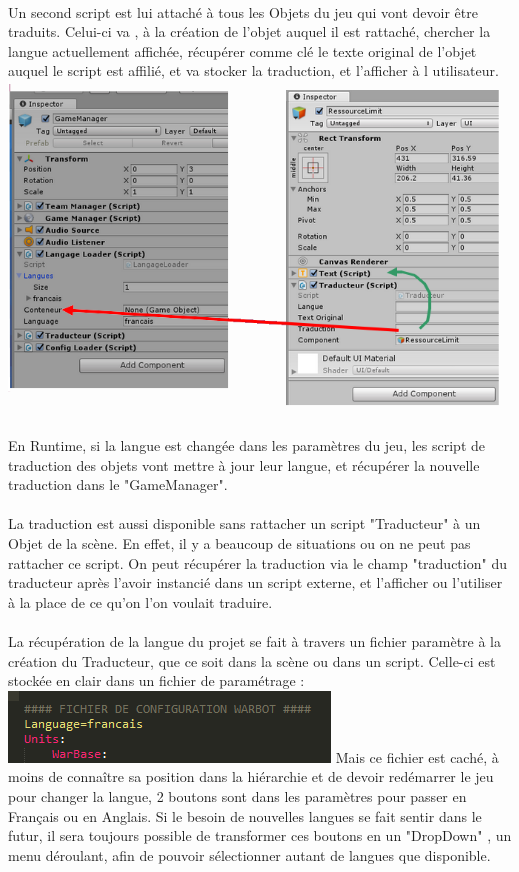 \documentclass{report}
\begin{document}
\paragraph{}
Un second script est lui attaché à tous les Objets du jeu qui vont devoir être traduits. Celui-ci va , à la création de l'objet auquel il est rattaché, chercher la langue actuellement affichée, récupérer comme clé le texte original de l'objet auquel le script est affilié, et va stocker la traduction, et l'afficher à l utilisateur.
\includegraphics{traducteur2.png}

En Runtime, si la langue est changée dans les paramètres du jeu, les script de traduction des objets vont mettre à jour leur langue, et récupérer la nouvelle traduction dans le "GameManager".
\paragraph{}
La traduction est aussi disponible sans rattacher un script "Traducteur" à un Objet de la scène.
En effet, il y a beaucoup de situations ou on ne peut pas rattacher ce script. On peut récupérer la traduction via le champ "traduction" du traducteur après l'avoir instancié dans un script externe, et l'afficher ou l'utiliser à la place de ce qu'on l'on voulait traduire.
\paragraph{}
La récupération de la langue du projet se fait à travers un fichier paramètre à la création du Traducteur, que ce soit dans la scène ou dans un script. 
Celle-ci est stockée en clair dans un fichier de paramétrage : 
\includegraphics{fichierconfig.png}
Mais ce fichier est caché, à moins de connaître sa position dans la hiérarchie et de devoir redémarrer le jeu pour changer la langue, 2 boutons sont dans les paramètres pour passer en Français ou en Anglais. Si le besoin de nouvelles langues se fait sentir dans le futur, il sera toujours possible de transformer ces boutons en un "DropDown" , un menu déroulant, afin de pouvoir sélectionner autant de langues que disponible.
\end{document}
